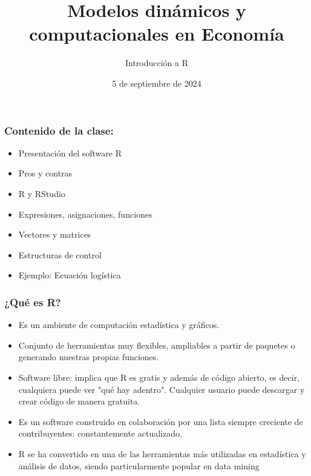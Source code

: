\documentclass[11pt]{beamer}
\begin{document}
	\title{Modelos dinámicos y computacionales en Economía}
	\subtitle{Introducción a R}
	\date{5 de septiembre de 2024}
	\frame[plain]{\maketitle}

\begin{frame}
\frametitle{Contenido de la clase:}
\begin{itemize}
	\item Presentación del software R
	\item Pros y contras
	\item R y RStudio
	\item Expresiones, asignaciones, funciones
	\item Vectores y matrices
	\item Estructuras de control
	\item Ejemplo: Ecuación logística	
\end{itemize}
\end{frame}

\begin{frame}
\frametitle{¿Qué es R?}
\begin{itemize}
	\item Es un ambiente de computación estadística y gráficos.
	\item Conjunto de herramientas muy flexibles, ampliables a partir de paquetes o generando nuestras propias funciones.
	\item Software libre: implica que R es gratis y además de código abierto, es decir, cualquiera puede ver "qué hay adentro". Cualquier usuario puede descargar y crear código de manera gratuita.
	\item Es un software construido en colaboración por una lista siempre creciente de contribuyentes: constantemente actualizado.
	\item R se ha convertido en una de las herramientas más utilizadas en estadística y análisis de datos, siendo particularmente popular en 
	data mining
\end{itemize}
\end{frame}
\end{document}
